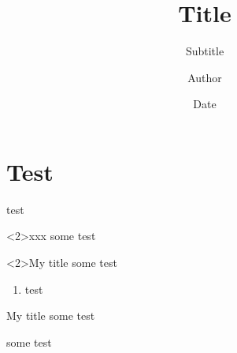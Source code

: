 \documentclass[
]{beamer}
\title{Title}
\author{Author}
\subtitle{Subtitle}
\date{Date}
\institute{Institute}
\begin{document}
\begin{frame}[t,plain]
\titlepage
\end{frame}

\section{Test}


\begin{frame}[t]

  test

  \begin{block}<2>{xxx}
  some test
  \end{block}

  \begin{alertblock}<2>{My title}
  some test
  \begin{enumerate}
  \item test
  \end{enumerate}
  \end{alertblock}

  \begin{exampleblock}{My title}
  some test
  \end{exampleblock}

  \begin{theorem}[Quack]
  some test
  \end{theorem}

\end{frame}
\end{document}
